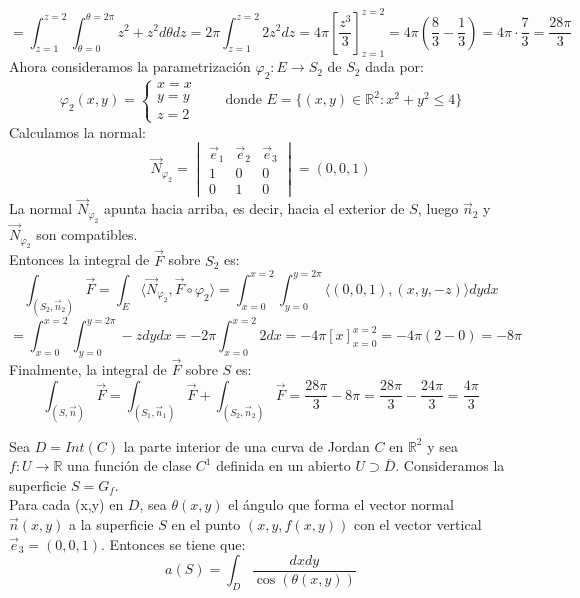 {    $$ = \int_{z=1}^{z=2} \int_{\theta = 0}^{\theta = 2\pi} z^2 + z^2 d\theta dz = 2 \pi \int_{z=1}^{z=2} 2z^2 dz = 4 \pi \left[ \frac{z^3}{3} \right]_{z=1}^{z=2} = 4 \pi \left( \frac{8}{3} - \frac{1}{3} \right) = 4 \pi \cdot \frac{7}{3} = \frac{28\pi}{3}$$
    Ahora consideramos la parametrización $\varphi_2 : E \to S_2$ de $S_2$ dada por:
    $$ \varphi_2 (x,y) = \begin{cases}
        x = x\\
        y = y\\
        z = 2
        \end{cases} \qquad \text{donde } E = \{(x,y) \in \mathbb{R}^2 : x^2 + y^2 \leq 4\}
    $$
    Calculamos la normal:
    $$ \vec{N}_{\varphi_2} =
        \begin{vmatrix}
            \vec{e}_1 & \vec{e}_2 & \vec{e}_3 \\
            1 & 0 & 0 \\
            0 & 1 & 0
        \end{vmatrix} = (0, 0, 1)$$
    La normal $\vec{N}_{\varphi_2}$ apunta hacia arriba, es decir, hacia el exterior de $S$, luego $\vec{n}_2$ y $\vec{N}_{\varphi_2}$ son compatibles.\\
    Entonces la integral de $\vec{F}$ sobre $S_2$ es:
    $$ \int_{(S_2, \vec{n}_2)} \vec{F} = \int_{E} \langle \vec{N}_{\varphi_2}, \vec{F} \circ \varphi_2 \rangle = \int_{x=0}^{x=2} \int_{y=0}^{y=2\pi} \langle (0, 0, 1), (x, y, -z) \rangle dy dx$$
    $$ = \int_{x=0}^{x=2} \int_{y=0}^{y=2\pi} -z dy dx = -2\pi \int_{x=0}^{x=2} 2 dx = -4\pi \left[ x \right]_{x=0}^{x=2} = -4\pi (2-0) = -8\pi$$
    Finalmente, la integral de $\vec{F}$ sobre $S$ es:
    $$ \int_{(S, \vec{n})} \vec{F} = \int_{(S_1, \vec{n}_1)} \vec{F} + \int_{(S_2, \vec{n}_2)} \vec{F} = \frac{28\pi}{3} - 8\pi = \frac{28\pi}{3} - \frac{24\pi}{3} = \frac{4\pi}{3} $$
    
}


\begin{proposición}
    Sea $D = Int(C)$ la parte interior de una curva de Jordan $C$ en $\mathbb{R}^2$ y sea $f : U \to \mathbb{R}$ una función de clase $C^1$ definida en un abierto $U \supset \overline{D}$. Consideramos la superficie $S = G_f$.\\
    Para cada (x,y) en $D$, sea $\theta(x,y)$ el ángulo que forma el vector normal $\vec{n}(x,y)$ a la superficie $S$ en el punto $(x,y,f(x,y))$ con el vector vertical $\vec{e}_3 = (0,0,1)$. Entonces se tiene que:
    $$ a(S) = \int_{D} \frac{dxdy}{\cos(\theta(x,y))}$$
\end{proposición}

